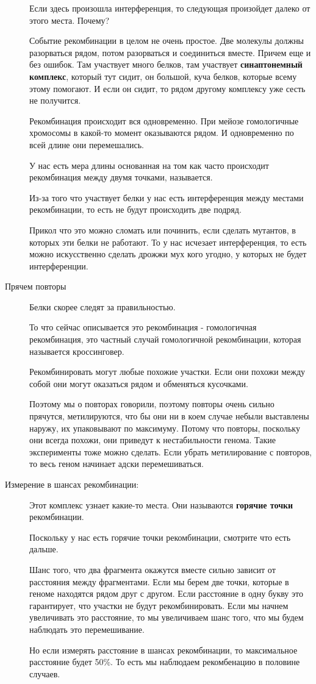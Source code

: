 \begin{description}
Если здесь произошла интерференция, то 
следующая произойдет далеко от этого места. Почему? 

Событие рекомбинации в целом не очень простое. 
Две молекулы должны разорваться рядом, потом 
разорваться и соединиться вместе. Причем еще и без
ошибок. 
Там участвует много белков, там участвует \textbf{синаптонемный
комплекс}, который тут сидит, он большой, 
куча белков, 
которые всему этому помогают. И если он сидит, то 
рядом другому комплексу уже сесть не получится. 

Рекомбинация происходит вся одновременно. При мейозе 
гомологичные хромосомы в какой-то момент оказываются рядом. 
И одновременно по всей длине они перемешались. 

У нас есть мера длины основанная на том как часто происходит 
рекомбинация между двумя точками, называется. 

Из-за того что участвует белки у нас есть интерференция между 
местами рекомбинации, то есть не будут происходить две подряд. 

Прикол что это можно сломать или починить, если 
сделать мутантов, в которых 
эти белки не работают. То у нас исчезает 
интерференция, то есть можно 
искусственно сделать дрожжи мух кого угодно, 
у которых не будет интерференции. 

\item[Прячем повторы]
Белки скорее следят за правильностью.

То что сейчас описывается это рекомбинация - гомологичная 
рекомбинация, это частный случай гомологичной рекомбинации, 
которая называется кроссинговер. 

Рекомбинировать могут любые похожие участки. Если они 
похожи между собой они могут оказаться рядом и обменяться кусочками. 

Поэтому мы о повторах говорили, поэтому повторы очень сильно прячутся, 
метилируются, что бы они ни в коем случае небыли выставлены наружу, 
их упаковывают по максимуму. Потому что повторы, поскольку 
они всегда похожи, 
они приведут к нестабильности генома. Такие эксперименты тоже 
можно сделать. Если убрать метилирование с повторов, то 
весь геном начинает адски перемешиваться. 

\item[Измерение в шансах рекомбинации:]
Этот комплекс узнает какие-то места. Они называются 
\textbf{горячие точки} рекомбинации. 

Поскольку у нас есть горячие точки рекомбинации, смотрите что есть дальше. 

Шанс того, что два фрагмента окажутся вместе сильно зависит от расстояния между фрагментами. 
Если мы берем две точки, которые в геноме находятся рядом друг с другом. Если расстояние в одну букву 
это гарантирует, что участки не
будут рекомбинировать. Если мы начнем увеличивать это расстояние, то мы увеличиваем шанс того, что мы будем наблюдать это перемешивание. 

Но если измерять расстояние в шансах рекомбинации, то максимальное расстояние будет 50\%.
То есть мы наблюдаем рекомбенацию в половине случаев.

\end{description}


